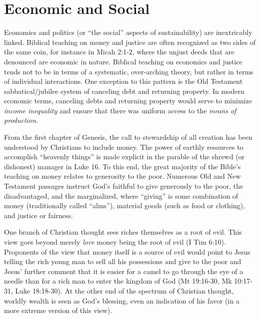\documentclass[12pt]{article}
\begin{document}


%
%
%



\section{Economic and Social}
\label{sec:economic}

Economics and politics (or ``the social'' aspects of sustainability) are inextricably linked. Biblical teaching on money
and justice are often recognized as two sides of the same coin, for instance in Micah 2:1-2, where the unjust deeds that
are denounced are economic in nature. Biblical teaching on economics and justice tends not to be in terms of a
systematic, over-arching theory, but rather in terms of individual interactions.
One exception to this pattern is the Old Testament sabbatical/jubilee system of canceling debt and returning property. 
In modern economic terms, canceling debts and returning property would serve to minimize 
\emph{income inequality} and ensure that there was uniform access to the \emph{means of production}.

From the first chapter of Genesis, the call to stewardship of all creation has
been understood by Christians to include money. The power of earthly resources to accomplish ``heavenly things'' is made
explicit in the parable of the shrewd (or dishonest) manager in Luke 16. To this end, the great majority of the Bible's
teaching on money relates to generosity to the poor. Numerous Old and New Testament passages instruct God's faithful to
give generously to the poor, the disadvantaged, and the marginalized, where ``giving'' is some combination of money
(traditionally called ``alms''), material goods (such as food or clothing), and justice or fairness.

One branch of Christian thought sees riches themselves as a root of evil. This view goes beyond merely \emph{love} money
being the root of evil (I Tim 6:10). Proponents of the view that money itself is a source of evil would point to Jesus
telling the rich young man to sell all his possessions and give to the poor and Jesus' further comment that it is easier
for a camel to go through the eye of a needle than for a rich man to enter the kingdom of God (Mt 19:16-30, Mk 10:17-31,
Luke 18:18-30). At the other end of the spectrum of Christian thought, worldly wealth is seen as God's blessing, even an
indication of his favor (in a more extreme version of this view).
\end{document}
